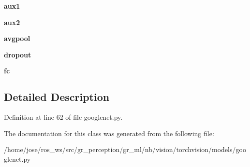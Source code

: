 \begin{DoxyCompactItemize}
{\bfseries aux1}
\item 
\mbox{\label{classtorchvision_1_1models_1_1googlenet_1_1GoogLeNet_a849ab492ae1afbf775019372843bae7a}} 
{\bfseries aux2}
\item 
\mbox{\label{classtorchvision_1_1models_1_1googlenet_1_1GoogLeNet_a14deced8f8ea8428087df1f482c6854f}} 
{\bfseries avgpool}
\item 
\mbox{\label{classtorchvision_1_1models_1_1googlenet_1_1GoogLeNet_a0b4e429c3a11c0368865116cda284844}} 
{\bfseries dropout}
\item 
\mbox{\label{classtorchvision_1_1models_1_1googlenet_1_1GoogLeNet_aa277cdc02b2efdbfbb5bd9f855d6a5fe}} 
{\bfseries fc}
\end{DoxyCompactItemize}


\subsection{Detailed Description}


Definition at line 62 of file googlenet.\+py.



The documentation for this class was generated from the following file\+:\begin{DoxyCompactItemize}
\item 
/home/jose/ros\+\_\+ws/src/gr\+\_\+perception/gr\+\_\+ml/nb/vision/torchvision/models/googlenet.\+py\end{DoxyCompactItemize}
